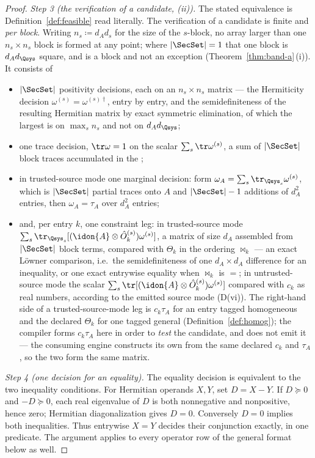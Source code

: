 \begin{proof}
\emph{Step 3 (the verification of a candidate, (ii)).} The stated equivalence
is Definition~\ref{def:feasible} read literally. The verification of a
candidate is finite and \emph{per block}. Writing $n_s\coloneqq d_Ad_s$ for
the size of the $s$-block, no array larger than one $n_s\times n_s$ block is
formed at any point; where $|\SecSet|=1$ that one block is $d_Ad_{\Qsys}$
square, and is a block and not an exception (Theorem~\ref{thm:band-a}\,(i)). It
consists of
\begin{itemize}[leftmargin=1.6em]
\item $|\SecSet|$ positivity decisions, each on an $n_s\times n_s$ matrix ---
  the Hermiticity decision $\omega^{(s)}=\omega^{(s)\dagger}$, entry by entry,
  and the semidefiniteness of the resulting Hermitian matrix by exact
  symmetric elimination, of which the largest is on $\max_sn_s$ and not on
  $d_Ad_{\Qsys}$;
\item one trace decision, $\tr\omega=1$ on the scalar
  $\sum_s\tr\omega^{(s)}$, a sum of $|\SecSet|$ block traces accumulated in the
  ;
\item in trusted-source mode one marginal decision: form
  $\omega_A=\sum_s\tr_{\Qsys_s}\omega^{(s)}$, which is
  $|\SecSet|$ partial traces onto $A$ and $|\SecSet|-1$ additions of $d_A^2$
  entries, then $\omega_A=\tau_A$ over $d_A^2$ entries;
\item and, per entry $k$, one constraint leg: in trusted-source mode
  $\sum_s\tr_{\Qsys_s}[(\idon{A}\otimes\hat O_k^{(s)})\omega^{(s)}]$, a
  matrix of size $d_A$ assembled from $|\SecSet|$ block terms, compared with
  $\Theta_k$ in the ordering $\bowtie_k$ --- an exact L\"owner comparison,
  i.e.\ the semidefiniteness of one $d_A\times d_A$ difference for an
  inequality, or one exact entrywise equality when $\bowtie_k$ is $=$; in
  untrusted-source mode the scalar
  $\sum_s\tr[(\idon{A}\otimes\hat O_k^{(s)})\omega^{(s)}]$ compared with
  $c_k$ as real numbers, according to the emitted source mode (D(vi)). The
  right-hand side of a trusted-source-mode leg is $c_k\tau_A$ for an entry
  tagged homogeneous and the declared $\Theta_k$ for one tagged general
  (Definition~\ref{def:homog}); the compiler forms $c_k\tau_A$ here in order
  to \emph{test} the candidate, and does not emit it --- the consuming engine
  constructs its own from the same declared $c_k$ and $\tau_A$, so the two
  form the same matrix.
\end{itemize}

\emph{Step 4 (one decision for an equality).} The equality decision is
equivalent to the two inequality conditions. For Hermitian operands $X,Y$, set
$D=X-Y$. If $D\succeq0$ and $-D\succeq0$, each real eigenvalue of $D$ is both
nonnegative and nonpositive, hence zero; Hermitian diagonalization gives
$D=0$. Conversely $D=0$ implies both inequalities. Thus entrywise $X=Y$
decides their conjunction exactly, in one predicate. The argument applies to
every operator row of the general format below as well.


\end{proof}

